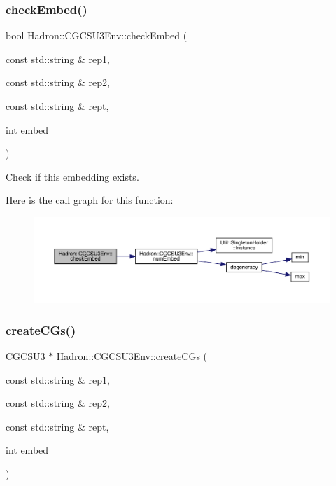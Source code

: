 \subsubsection{\texorpdfstring{checkEmbed()}{checkEmbed()}}
{\footnotesize\ttfamily bool Hadron\+::\+C\+G\+C\+S\+U3\+Env\+::check\+Embed (\begin{DoxyParamCaption}\item[{const std\+::string \&}]{rep1,  }\item[{const std\+::string \&}]{rep2,  }\item[{const std\+::string \&}]{rept,  }\item[{int}]{embed }\end{DoxyParamCaption})}



Check if this embedding exists. 

Here is the call graph for this function\+:\nopagebreak
\begin{figure}[H]
\begin{center}
\leavevmode
\includegraphics[width=350pt]{d4/d47/namespaceHadron_1_1CGCSU3Env_a27b5d0906a9a8d201a8479db853e5ca5_cgraph}
\end{center}
\end{figure}
\mbox{\label{namespaceHadron_1_1CGCSU3Env_aa351bf5350216c70336911a96182d035}} 
\subsubsection{\texorpdfstring{createCGs()}{createCGs()}}
{\footnotesize\ttfamily \mbox{\hyperlink{classHadron_1_1CGCSU3}{C\+G\+C\+S\+U3}} $\ast$ Hadron\+::\+C\+G\+C\+S\+U3\+Env\+::create\+C\+Gs (\begin{DoxyParamCaption}\item[{const std\+::string \&}]{rep1,  }\item[{const std\+::string \&}]{rep2,  }\item[{const std\+::string \&}]{rept,  }\item[{int}]{embed }\end{DoxyParamCaption})}



